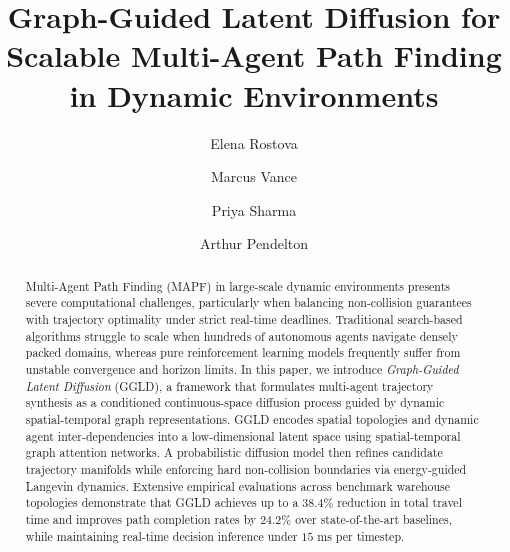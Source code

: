 \documentclass[runningheads]{llncs}
\begin{document}
\title{Graph-Guided Latent Diffusion for Scalable Multi-Agent Path Finding in Dynamic Environments}

\author{Elena Rostova \and
Marcus Vance \and
Priya Sharma \and
Arthur Pendelton}



\maketitle

\begin{abstract}
Multi-Agent Path Finding (MAPF) in large-scale dynamic environments presents severe computational challenges, particularly when balancing non-collision guarantees with trajectory optimality under strict real-time deadlines. Traditional search-based algorithms struggle to scale when hundreds of autonomous agents navigate densely packed domains, whereas pure reinforcement learning models frequently suffer from unstable convergence and horizon limits. In this paper, we introduce \emph{Graph-Guided Latent Diffusion} (GGLD), a framework that formulates multi-agent trajectory synthesis as a conditioned continuous-space diffusion process guided by dynamic spatial-temporal graph representations. GGLD encodes spatial topologies and dynamic agent inter-dependencies into a low-dimensional latent space using spatial-temporal graph attention networks. A probabilistic diffusion model then refines candidate trajectory manifolds while enforcing hard non-collision boundaries via energy-guided Langevin dynamics. Extensive empirical evaluations across benchmark warehouse topologies demonstrate that GGLD achieves up to a $38.4\%$ reduction in total travel time and improves path completion rates by $24.2\%$ over state-of-the-art baselines, while maintaining real-time decision inference under $15\text{~ms}$ per timestep.

\end{abstract}
\end{document}
